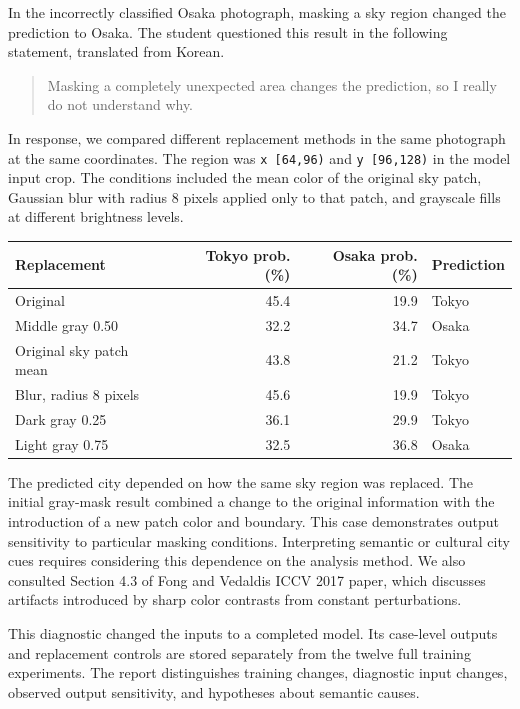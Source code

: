 \documentclass[11pt]{article}
\begin{document}
In the incorrectly classified Osaka photograph, masking a sky region changed
the prediction to Osaka. The student questioned this result in the following
statement, translated from Korean.

\begin{quote}\small
Masking a completely unexpected area changes the prediction, so I really do
not understand why.
\end{quote}

In response, we compared different replacement methods in the same photograph
at the same coordinates. The region was \texttt{x [64,96)} and
\texttt{y [96,128)} in the model input crop. The conditions included the mean
color of the original sky patch, Gaussian blur with radius 8 pixels applied
only to that patch, and grayscale fills at different brightness levels.

\begin{center}\small
\begin{tabular}{lrrl}
\toprule
Replacement & Tokyo prob. (\%) & Osaka prob. (\%) & Prediction \\
\midrule
Original & 45.4 & 19.9 & Tokyo \\
Middle gray 0.50 & 32.2 & 34.7 & Osaka \\
Original sky patch mean & 43.8 & 21.2 & Tokyo \\
Blur, radius 8 pixels & 45.6 & 19.9 & Tokyo \\
Dark gray 0.25 & 36.1 & 29.9 & Tokyo \\
Light gray 0.75 & 32.5 & 36.8 & Osaka \\
\bottomrule
\end{tabular}
\end{center}

The predicted city depended on how the same sky region was replaced. The
initial gray-mask result combined a change to the original information with
the introduction of a new patch color and boundary. This case demonstrates
output sensitivity to particular masking conditions. Interpreting semantic
or cultural city cues requires considering this dependence on the analysis
method. We also consulted Section 4.3 of Fong and Vedaldi\textquotesingle{}s ICCV 2017 paper,
which discusses artifacts introduced by sharp color contrasts from constant
perturbations.

This diagnostic changed the inputs to a completed model. Its case-level
outputs and replacement controls are stored separately from the twelve full
training experiments. The report distinguishes training changes, diagnostic
input changes, observed output sensitivity, and hypotheses about semantic
causes.
\end{document}
